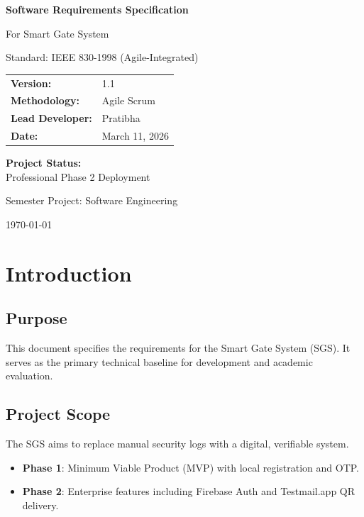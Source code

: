 \documentclass[12pt,a4paper]{article}
\begin{document}
\begin{titlepage}
    \centering
    \scshape
    \vspace*{1cm}
    {\huge\bfseries Software Requirements Specification\par}
    \vspace{0.5cm}
    {\Large For Smart Gate System\par}
    \vspace{1.5cm}
    {\large Standard: IEEE 830-1998 (Agile-Integrated)\par}
    \vspace{2cm}
    
    \begin{table}[h]
        \centering
        \begin{tabular}{ll}
            \textbf{Version:} & 1.1 \\
            \textbf{Methodology:} & Agile Scrum \\
            \textbf{Lead Developer:} & Pratibha \\
            \textbf{Date:} & March 11, 2026
        \end{tabular}
    \end{table}

    \vspace{2cm}
    \textbf{Project Status:}\\
    Professional Phase 2 Deployment
    
    \vfill
    {\large Semester Project: Software Engineering\par}
    {\large \today\par}
\end{titlepage}

\tableofcontents
\newpage

\section{Introduction}
\subsection{Purpose}
This document specifies the requirements for the Smart Gate System (SGS). It serves as the primary technical baseline for development and academic evaluation.

\subsection{Project Scope}
The SGS aims to replace manual security logs with a digital, verifiable system.
\begin{itemize}
    \item \textbf{Phase 1}: Minimum Viable Product (MVP) with local registration and OTP.
    \item \textbf{Phase 2}: Enterprise features including Firebase Auth and Testmail.app QR delivery.
\end{itemize}
\end{document}
